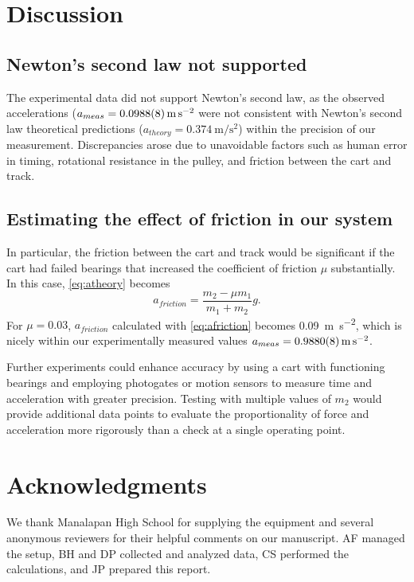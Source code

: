 \documentclass[reprint,amsmath,amssymb,aps]{revtex4-2}
\begin{document}




\section{Discussion}
\subsection{Newton's second law not supported}
The experimental data did not support Newton’s second law, as the observed accelerations ($a_{meas}=\qty{0.0988\pm0.0008}{\meter\per\second\squared}$ were not consistent with Newton's second law theoretical predictions ($a_{theory}=\qty{0.374}{\meter\per\second\squared}$) within the precision of our measurement. Discrepancies arose due to unavoidable factors such as human error in timing, rotational resistance in the pulley, and friction between the cart and track.

\subsection{Estimating the effect of friction in our system}
In particular, the friction between the cart and track would be significant if the cart had failed bearings that increased the coefficient of friction $\mu$ substantially. In this case, \cref{eq:atheory} becomes
\begin{equation}
a_{friction} = \dfrac{m_2 - \mu m_1}{m_1 + m_2} g.
\label{eq:afriction}
\end{equation}
For $\mu=0.03$, $a_{friction}$ calculated with \cref{eq:afriction} becomes \qty{0.09}{\meter\per\second\squared}, which is nicely within our experimentally measured values $a_{meas}=\qty{0.988\pm0.0008}{\meter\per\second\squared}$. 

Further experiments could enhance accuracy by using a cart with functioning bearings and employing photogates or motion sensors to measure time and acceleration with greater precision. Testing with multiple values of $m_2$ would provide additional data points to evaluate the proportionality of force and acceleration more rigorously than a check at a single operating point. 





\section{Acknowledgments}
We thank Manalapan High School for supplying the equipment and several anonymous reviewers for their helpful comments on our manuscript. AF managed the setup, BH and DP collected and analyzed data, CS performed the calculations, and JP prepared this report.

%

\end{document}
